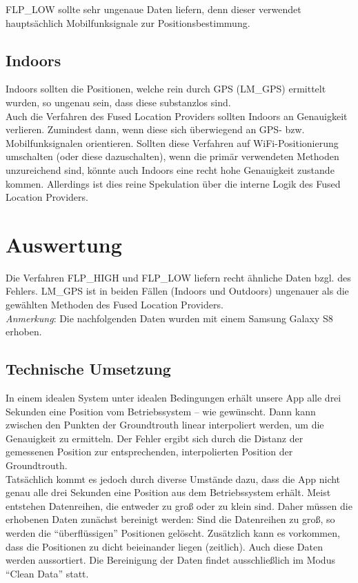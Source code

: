 FLP\_LOW sollte sehr ungenaue Daten liefern, denn dieser verwendet hauptsächlich Mobilfunksignale zur Positionsbestimmung.

\subsection{Indoors}

Indoors sollten die Positionen, welche rein durch GPS (LM\_GPS) ermittelt wurden, so ungenau sein, dass diese substanzlos sind. \\

Auch die Verfahren des Fused Location Providers sollten Indoors an Genauigkeit verlieren. Zumindest dann, wenn diese sich überwiegend an GPS- bzw. Mobilfunksignalen orientieren. Sollten diese Verfahren auf WiFi-Positionierung umschalten (oder diese dazuschalten), wenn die primär verwendeten Methoden unzureichend sind, könnte auch Indoors eine recht hohe Genauigkeit zustande kommen. Allerdings ist dies reine Spekulation über die interne Logik des Fused Location Providers.

\section{Auswertung}	

Die Verfahren FLP\_HIGH und FLP\_LOW liefern recht ähnliche Daten bzgl. des Fehlers. LM\_GPS ist in beiden Fällen (Indoors und Outdoors) ungenauer als die gewählten Methoden des Fused Location Providers.\\

\textit{Anmerkung}: Die nachfolgenden Daten wurden mit einem Samsung Galaxy S8 erhoben.

\subsection{Technische Umsetzung}

In einem idealen System unter idealen Bedingungen erhält unsere App alle drei Sekunden eine Position vom Betriebssystem -- wie gewünscht. Dann kann zwischen den Punkten der Groundtrouth linear interpoliert werden, um die Genauigkeit zu ermitteln. Der Fehler ergibt sich durch die Distanz der gemessenen Position zur entsprechenden, interpolierten Position der Groundtrouth. \\

Tatsächlich kommt es jedoch durch diverse Umstände dazu, dass die App nicht genau alle drei Sekunden eine Position aus dem Betriebssystem erhält. Meist entstehen Datenreihen, die entweder zu groß oder zu klein sind. Daher müssen die erhobenen Daten zunächst bereinigt werden: Sind die Datenreihen zu groß, so werden die "`überflüssigen"' Positionen gelöscht. Zusätzlich kann es vorkommen, dass die Positionen zu dicht beieinander liegen (zeitlich). Auch diese Daten werden aussortiert. Die Bereinigung der Daten findet ausschließlich im Modus "`Clean Data"' statt. \\

